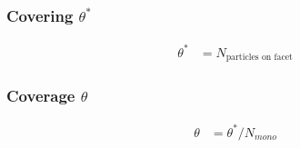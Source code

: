 \subsubsection*{Covering $\theta^*$}
\begin{equation}
	\begin{split}
		\theta^*&=N_{\text{particles on facet}}
	\end{split}
\end{equation}

\subsubsection*{Coverage $\theta$}
\begin{equation}
	\label{eq:cov}
	\begin{split}
		\theta&=\theta^*/N_{mono}
	\end{split}
\end{equation}

%
%

